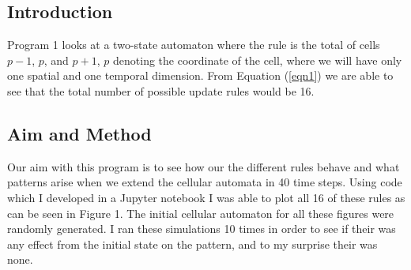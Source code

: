 \documentclass{article}
\begin{document}
\subsection{Introduction}
Program 1 looks at a two-state automaton where the rule is the total of cells $p-1$, $p$, and $p+1$, $p$ denoting the coordinate of the cell, where we will have only one spatial and one temporal dimension. From Equation (\ref{eqn1}) we are able to see that the total number of possible update rules would be 16.
\subsection{Aim and Method}
Our aim with this program is to see how our the different rules behave and what patterns arise when we extend the cellular automata in 40 time steps. Using code which I developed in a Jupyter notebook \cite{labbook} I was able to plot all 16 of these rules as can be seen in Figure 1. The initial cellular automaton for all these figures were randomly generated. I ran these simulations 10 times in order to see if their was any effect from the initial state on the pattern, and to my surprise their was none.
\end{document}
